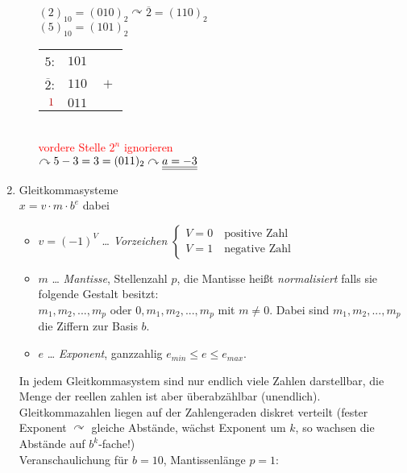 \begin{enumerate}
\begin{itemize}
$(2)_{10}=(010)_2 \curvearrowright \overline{2}=(110)_2$\\
$(5)_{10}=(101)_2$\\
\begin{tabular}{r l}
$5$:& $101$\\
$\overline{2}$:& $110 \quad +$\\
$\textcolor{red}{1}$& $011$
\end{tabular}\\
\textcolor{red}{vordere Stelle $2^n$ ignorieren}\\
$\curvearrowright 5-3=3=(011)_2 \curvearrowright \underline{\underline{a=-3}}$
\end{itemize}
\item Gleitkommasysteme\\
$\boxed{x=v\cdot m \cdot b^e}$ dabei
\begin{itemize}
\item $v=(-1)^V$ … \emph{Vorzeichen} $\begin{cases}
V= 0 \quad \text{positive Zahl}\\
V=1 \quad \text{negative Zahl}
\end{cases}$
\item $m$ … \emph{Mantisse}, Stellenzahl $p$, die Mantisse heißt \emph{normalisiert} falls sie folgende Gestalt besitzt:\\
 $m_1, m_2, ..., m_p$ oder $0, m_1, m_2, ..., m_p$ mit $m\not = 0$. Dabei sind  $m_1, m_2, ..., m_p$ die Ziffern zur Basis $b$.
\item $e$ … \emph{Exponent}, ganzzahlig $e_{min}\leq e \leq e_{max}$.
\end{itemize}
In jedem Gleitkommasystem sind nur endlich viele Zahlen darstellbar, die Menge der reellen zahlen ist aber überabzählbar (unendlich).\\
Gleitkommazahlen liegen auf der Zahlengeraden diskret verteilt (fester Exponent $\curvearrowright$ gleiche Abstände, wächst Exponent um $k$, so wachsen die Abstände auf $b^k$-fache!)\\
Veranschaulichung für $b=10$, Mantissenlänge $p=1$:\\
\end{enumerate}
